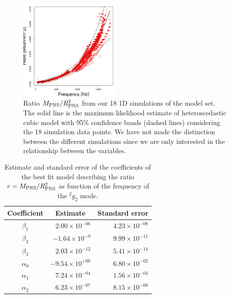 \documentclass[aps, twocolumn, superscriptaddress, showpacs, nofootinbib, longbibliography]{revtex4-1}
\begin{document}
 
\begin{figure}[t]
 \centering
 \includegraphics[width=0.45\textwidth]{plots/model}
 \caption{Ratio $M_{\rm PNS}/R_{\rm PNS}^2$ from our 18 1D simulations of the model set. The solid line is the maximum likelihood estimate of heteroscedastic cubic model with 95\% confidence bands (dashed lines) considering the 18 simulation data points. We have not made the distinction between the different simulations since we are only interested in the relationship between the variables.}

 \label{fig:LMVAR}
\end{figure}



\begin{table}[h]
 \begin{tabular}{crr}
    \hline
    Coefficient & \multicolumn{1}{c}{Estimate} & Standard error \\
    \hline
   $\beta_1$  &  $ 2.00 \times 10^{-06}$ & $4.23 \times 10^{-08}$ \\   
   $\beta_2$  &  $-1.64 \times 10^{-9}$ & $9.99 \times 10^{-11}$ \\
   $\beta_3$  &  $ 2.03 \times 10^{-12}$ & $5.41 \times 10^{-14}$ \\
   $\alpha_0$ &  $-9.54 \times 10^{+00}$ & $6.80 \times 10^{-02}$ \\
   $\alpha_1$ &  $ 7.24 \times 10^{-04}$ & $1.56 \times 10^{-04}$ \\
   $\alpha_2$ &  $ 6.23 \times 10^{-07}$ & $8.15 \times 10^{-08}$ \\   
    \hline
  \end{tabular}
\caption{Estimate and standard error of the coefficients of the best fit model describing the ratio $r=M_{\rm PNS}/R_{\rm PNS}^2$ as function of the frequency of the $\mbox{}^2g_2$ mode.}\label{tab:model}
\end{table}
\end{document}
